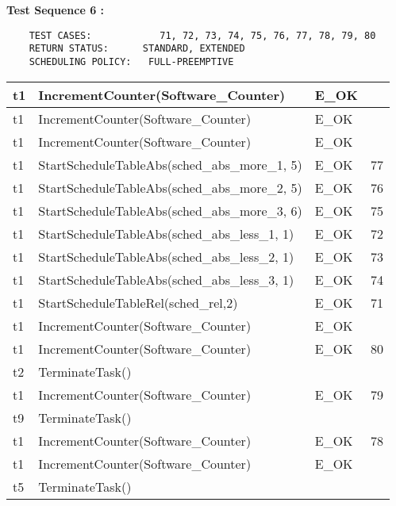 \documentclass[10pt]{article}
\newlength{\Li}\settowidth{\Li}{Running}
\newlength{\Lii}\setlength{\Lii}{7cm}
\newlength{\Liiii}\setlength{\Liiii}{0.9cm}
\newlength{\Liii}\setlength{\Liii}{\textwidth} \addtolength{\Liii}{-\Li} \addtolength{\Liii}{-\Lii} \addtolength{\Liii}{-\Liiii}
\begin{document}
	
	\textbf{Test Sequence 6 :}
	\begin{lstlisting}
	TEST CASES:		       71, 72, 73, 74, 75, 76, 77, 78, 79, 80
	RETURN STATUS:	  	STANDARD, EXTENDED
	SCHEDULING POLICY:   FULL-PREEMPTIVE
	\end{lstlisting}
	

	\begin{supertabular}{|p{\Li}|p{\Lii}|p{\Liii}|p{\Liiii}|} \hline 
	t1		& IncrementCounter(Software\_Counter)										& E\_OK												& \\ \hline
	t1		& IncrementCounter(Software\_Counter)										& E\_OK												& \\ \hline
	t1		& IncrementCounter(Software\_Counter)										& E\_OK												& \\ \hline

	t1		& StartScheduleTableAbs(sched\_abs\_more\_1, 5)								& E\_OK												& 77 \\ \hline
	t1		& StartScheduleTableAbs(sched\_abs\_more\_2, 5)								& E\_OK												& 76 \\ \hline
	t1		& StartScheduleTableAbs(sched\_abs\_more\_3, 6)								& E\_OK												& 75 \\ \hline
	t1		& StartScheduleTableAbs(sched\_abs\_less\_1, 1)								& E\_OK												& 72 \\ \hline
	t1		& StartScheduleTableAbs(sched\_abs\_less\_2, 1)								& E\_OK												& 73 \\ \hline
	t1		& StartScheduleTableAbs(sched\_abs\_less\_3, 1)								& E\_OK												& 74 \\ \hline
	t1		& StartScheduleTableRel(sched\_rel,2)										& E\_OK												& 71 \\ \hline

	t1		& IncrementCounter(Software\_Counter)										& E\_OK												& \\ \hline
	t1		& IncrementCounter(Software\_Counter)										& E\_OK												& 80 \\ \hline
	t2		& TerminateTask()														& 													& \\ \hline

	t1		& IncrementCounter(Software\_Counter)										& E\_OK												& 79 \\ \hline
	t9		& TerminateTask()														& 													& \\ \hline

	t1		& IncrementCounter(Software\_Counter)										& E\_OK												& 78 \\ \hline
	t1		& IncrementCounter(Software\_Counter)										& E\_OK												& \\ \hline
	t5		& TerminateTask()														& 													& \\ \hline
	

\end{supertabular}
\end{document}
